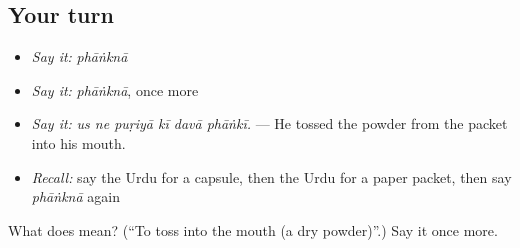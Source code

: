 \subsection*{Your turn}
\begin{itemize}
\raggedright
  \item \emph{Say it:} \emph{phāṅknā}
  \item \emph{Say it:} \emph{phāṅknā}, once more
  \item \emph{Say it:} \emph{us ne puṛiyā kī davā phāṅkī.} — He tossed the powder from the packet into his mouth.
  \item \emph{Recall:} say the Urdu for a capsule, then the Urdu for a paper packet, then say \emph{phāṅknā} again
\end{itemize}

\begin{tcolorbox}[breakable,colback=teal!4,colframe=teal!35!black,title={Before you move on}]
What does  mean? (\textquotedblleft{}To toss into the mouth (a dry powder)\textquotedblright{}.) Say it once more.
\end{tcolorbox}

